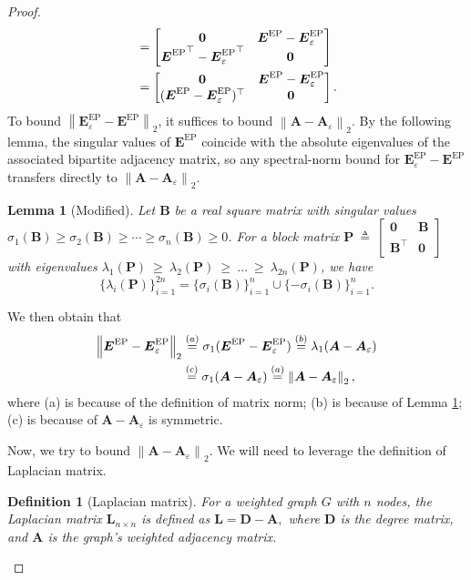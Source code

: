 \documentclass[lettersize,journal]{IEEEtran}
\newcommand{\adj}{\a}
\renewcommand{\deg}{\boldsymbol{D}}
\newcommand{\lap}{\boldsymbol{L}}
\newcommand{\norm}[1]{\left\lVert#1\right\rVert}
\newcommand{\allzeros}[1]{\boldsymbol{0}_{#1}}
\newcommand{\GEP}{\boldsymbol{E}^{\mathrm{EP}}}
\renewcommand{\a}{\boldsymbol{a}}
\renewcommand{\adj}{\boldsymbol{A}}
\newtheorem{definition}{Definition}
\newtheorem{lemma}{Lemma}
\begin{document}
{\begin{proof}
\begin{align*}
    &= \begin{bmatrix}
        \allzeros{} & \GEP - \GEP_\varepsilon \\
        {\GEP}^\top-{\GEP_\varepsilon}^\top &\allzeros{}
    \end{bmatrix} \notag\\
    &= \begin{bmatrix}
        \allzeros{} & \GEP - \GEP_\varepsilon \\
        (\GEP-\GEP_\varepsilon)^\top &\allzeros{}
    \end{bmatrix}.
\end{align*}
To bound $\norm{\GEP_{\varepsilon} - \GEP}_2$, it suffices to bound $\norm{\adj - \adj_\varepsilon}_2$. By the following lemma, the singular values of $\GEP$ coincide with the absolute eigenvalues of the associated bipartite adjacency matrix, so any spectral-norm bound for $\GEP_{\varepsilon} - \GEP$ transfers directly to $\norm{\adj-\adj_{\varepsilon}}_2$.
\begin{lemma} [Modified{\cite[Theorem 7.3.3]{Horn_Johnson_1985}}]
\label{lem: eig-adj-sig-biadj} 
    Let $\boldsymbol{B}$ be a real square matrix with singular values $\sigma_1(\boldsymbol{B}) \geq \sigma_2(\boldsymbol{B}) \geq \cdots \geq \sigma_n(\boldsymbol{B}) \geq 0$. For a block matrix $\boldsymbol{P}~\triangleq~\begin{bmatrix}
        \allzeros{} & \boldsymbol{B}\\
        \boldsymbol{B}^\top & \allzeros{}
    \end{bmatrix}$ with eigenvalues $\lambda_1(\boldsymbol{P})~\geq~\lambda_2(\boldsymbol{P})~\geq~\dots~\geq~\lambda_{2n}(\boldsymbol{P})$, we have
    \[
        \{\lambda_i(\boldsymbol{P})\}_{i=1}^{2n} = \{\sigma_i(\boldsymbol{B})\}_{i=1}^n \cup \{-\sigma_i(\boldsymbol{B})\}_{i=1}^n.
    \]
\end{lemma}%
We then obtain that
\begin{align}
\label{eq:same-matrix-norm}
    \norm{\GEP - \GEP_\varepsilon}_2 
    &\overset{(a)}{=} \sigma_1(\GEP - \GEP_\varepsilon) \overset{(b)}{=} \lambda_1(\adj - \adj_\varepsilon)\notag\\
    &\overset{(c)}{=} \sigma_1(\adj - \adj_\varepsilon) \overset{(a)}{=}\norm{\adj - \adj_\varepsilon}_2,
\end{align}
where (a) is because of the definition of matrix norm; (b) is because of Lemma \ref{lem: eig-adj-sig-biadj}; (c) is because of $\adj - \adj_\varepsilon$ is symmetric.

Now, we try to bound $\norm{\adj - \adj_\varepsilon}_2$. We will need to leverage the definition of Laplacian matrix.
\begin{definition} [Laplacian matrix]
\label{def:laplacian-matrix}
    For a weighted graph $G$ with $n$ nodes, the Laplacian matrix $\lap_{n\times n}$ is defined as 
    $
    \lap = \deg - \adj,
    $
    where $\deg$ is the degree matrix, and $\adj$ is the graph's weighted adjacency matrix.
\end{definition}


\end{proof}}
\end{document}
